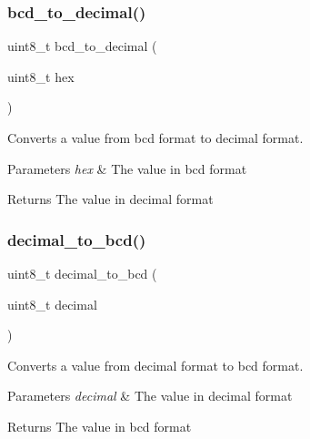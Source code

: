 \subsubsection{\texorpdfstring{bcd\+\_\+to\+\_\+decimal()}{bcd\_to\_decimal()}}
{\footnotesize\ttfamily uint8\+\_\+t bcd\+\_\+to\+\_\+decimal (\begin{DoxyParamCaption}\item[{uint8\+\_\+t}]{hex }\end{DoxyParamCaption})}



Converts a value from bcd format to decimal format. 


\begin{DoxyParams}{Parameters}
{\em hex} & The value in bcd format\\
\hline
\end{DoxyParams}
\begin{DoxyReturn}{Returns}
The value in decimal format 
\end{DoxyReturn}
\mbox{\label{group__utils_ga8c10bb1f9a5bb82b67c6980182193c54}} 
\subsubsection{\texorpdfstring{decimal\+\_\+to\+\_\+bcd()}{decimal\_to\_bcd()}}
{\footnotesize\ttfamily uint8\+\_\+t decimal\+\_\+to\+\_\+bcd (\begin{DoxyParamCaption}\item[{uint8\+\_\+t}]{decimal }\end{DoxyParamCaption})}



Converts a value from decimal format to bcd format. 


\begin{DoxyParams}{Parameters}
{\em decimal} & The value in decimal format\\
\hline
\end{DoxyParams}
\begin{DoxyReturn}{Returns}
The value in bcd format 
\end{DoxyReturn}
\mbox{\label{group__utils_ga2b56f50ba159e9d5115ed1a75eff15d9}} 
